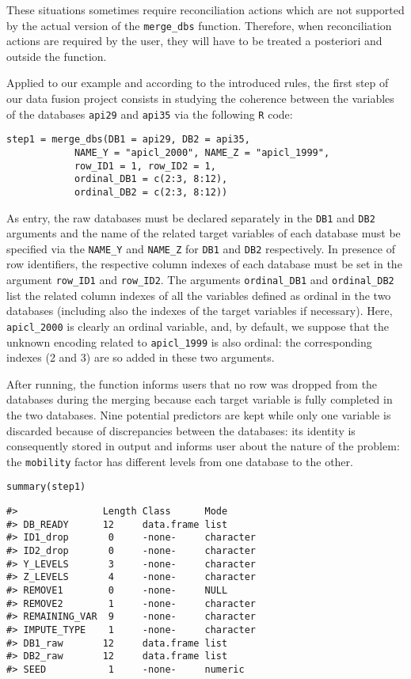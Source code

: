These situations sometimes require reconciliation actions which are not supported by the actual version of the \texttt{merge\_dbs} function. Therefore, when reconciliation actions are required by the user, they will have to be treated a posteriori and outside the function.

Applied to our example and according to the introduced rules, the first step of our data fusion project consists in studying the coherence between the variables of the databases \texttt{api29} and \texttt{api35} via the following \texttt{R} code:

\begin{verbatim}
step1 = merge_dbs(DB1 = api29, DB2 = api35,
            NAME_Y = "apicl_2000", NAME_Z = "apicl_1999",
            row_ID1 = 1, row_ID2 = 1,  
            ordinal_DB1 = c(2:3, 8:12), 
            ordinal_DB2 = c(2:3, 8:12))
\end{verbatim}

As entry, the raw databases must be declared separately in the \texttt{DB1} and \texttt{DB2} arguments and the name of
the related target variables of each database must be specified via the \texttt{NAME\_Y} and \texttt{NAME\_Z} for \texttt{DB1} and \texttt{DB2} respectively. In presence of row identifiers, the respective column indexes of each database must be set in the argument \texttt{row\_ID1} and \texttt{row\_ID2}. The arguments \texttt{ordinal\_DB1} and \texttt{ordinal\_DB2} list the related
column indexes of all the variables defined as ordinal in the two databases (including also the indexes of the
target variables if necessary). Here, \texttt{apicl\_2000} is clearly an ordinal variable, and, by default, we suppose
that the unknown encoding related to \texttt{apicl\_1999} is also ordinal: the corresponding indexes (2 and 3) are so
added in these two arguments.

After running, the function informs users that no row was dropped from the databases during the merging
because each target variable is fully completed in the two databases. Nine potential predictors are kept while
only one variable is discarded because of discrepancies between the databases: its identity is consequently stored in output and informs user about the nature of the problem: the \texttt{mobility} factor has different levels from one database to the other.

\begin{verbatim}
summary(step1)
\end{verbatim}

\begin{verbatim}
#>               Length Class      Mode     
#> DB_READY      12     data.frame list     
#> ID1_drop       0     -none-     character
#> ID2_drop       0     -none-     character
#> Y_LEVELS       3     -none-     character
#> Z_LEVELS       4     -none-     character
#> REMOVE1        0     -none-     NULL     
#> REMOVE2        1     -none-     character
#> REMAINING_VAR  9     -none-     character
#> IMPUTE_TYPE    1     -none-     character
#> DB1_raw       12     data.frame list     
#> DB2_raw       12     data.frame list     
#> SEED           1     -none-     numeric
\end{verbatim}

